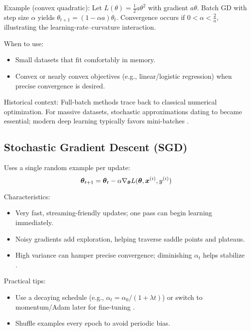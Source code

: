 Example (convex quadratic): Let \(L(\theta)=\tfrac{1}{2}a\theta^2\) with gradient \(a\theta\). Batch GD with step size \(\alpha\) yields \(\theta_{t+1}=(1-\alpha a)\theta_t\). Convergence occurs if \(0<\alpha<\tfrac{2}{a}\), illustrating the learning-rate–curvature interaction.

When to use:
\begin{itemize}
    \item Small datasets that fit comfortably in memory.
    \item Convex or nearly convex objectives (e.g., linear/logistic regression) when precise convergence is desired.
\end{itemize}

Historical context: Full-batch methods trace back to classical numerical optimization. For massive datasets, stochastic approximations dating to \cite{RobbinsMonro1951} became essential; modern deep learning typically favors mini-batches \cite{GoodfellowEtAl2016,WebOptimizationDLBook,D2LChapterOptimization}.

\subsection{Stochastic Gradient Descent (SGD)}

Uses a single random example per update:
\begin{equation}
\boldsymbol{\theta}_{t+1} = \boldsymbol{\theta}_t - \alpha \nabla_{\boldsymbol{\theta}} L(\boldsymbol{\theta}, \boldsymbol{x}^{(i)}, y^{(i)})
\end{equation}

Characteristics:
\begin{itemize}
    \item Very fast, streaming-friendly updates; one pass can begin learning immediately.
    \item Noisy gradients add exploration, helping traverse saddle points and plateaus.
    \item High variance can hamper precise convergence; diminishing \(\alpha_t\) helps stabilize \cite{RobbinsMonro1951}.
\end{itemize}

Practical tips:
\begin{itemize}
    \item Use a decaying schedule (e.g., \(\alpha_t = \alpha_0/(1+\lambda t)\)) or switch to momentum/Adam later for fine-tuning \cite{WebOptimizationDLBook,D2LChapterOptimization}.
    \item Shuffle examples every epoch to avoid periodic bias.
\end{itemize}

